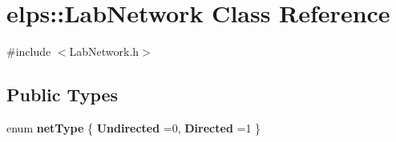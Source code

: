 \hypertarget{classelps_1_1_lab_network}{\section{elps\+:\+:Lab\+Network Class Reference}
\label{classelps_1_1_lab_network}
}


{\ttfamily \#include $<$Lab\+Network.\+h$>$}

\subsection*{Public Types}
\begin{DoxyCompactItemize}
\item 
\hypertarget{classelps_1_1_lab_network_a7062215bc80ba41ee85d6be07926e6cc}{enum {\bfseries net\+Type} \{ {\bfseries Undirected} =0, 
{\bfseries Directed} =1
 \}}\label{classelps_1_1_lab_network_a7062215bc80ba41ee85d6be07926e6cc}

\end{DoxyCompactItemize}
